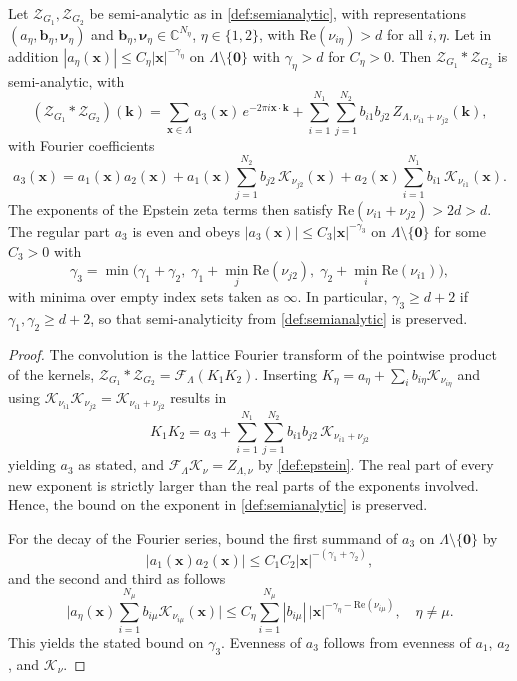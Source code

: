 \documentclass[]{amsart}
\numberwithin{mythm}{section}
\begin{document}
\begin{theorem}
\label{thm:convolution}
Let $\mathcal Z_{G_1},\mathcal Z_{G_2}$ be semi-analytic as in \cref{def:semianalytic}, with representations $(a_\eta,\bm b_\eta,\bm\nu_\eta)$ and $\bm b_\eta,\bm\nu_\eta\in\mathds C^{N_\eta}$, $\eta\in\{1,2\}$, with $\mathrm{Re}(\nu_{i\eta})>d$ for all $i,\eta$. Let in addition $|a_\eta(\bm x)|\le C_\eta|\bm x|^{-\gamma_\eta}$ on $\Lambda\setminus\{\bm 0\}$ with $\gamma_\eta>d$ for $C_\eta>0$. Then $\mathcal Z_{G_1}\ast\mathcal Z_{G_2}$ is semi-analytic, with
\[
(\mathcal Z_{G_1}\ast\mathcal Z_{G_2})(\bm k)
=\sum_{\bm x\in\Lambda}a_3(\bm x)\,e^{-2\pi i\bm x\cdot\bm k}+\sum_{i=1}^{N_1}\sum_{j=1}^{N_2}b_{i1}b_{j2}\,
Z_{\Lambda,\nu_{i1}+\nu_{j2}}(\bm k),
\]
with Fourier coefficients
\[
a_3(\bm x)=a_1(\bm x)a_2(\bm x)
+a_1(\bm x)\sum_{j=1}^{N_2}b_{j2}\,\mathcal K_{\nu_{j2}}(\bm x)
+a_2(\bm x)\sum_{i=1}^{N_1}b_{i1}\,\mathcal K_{\nu_{i1}}(\bm x) .
\]
The exponents of the Epstein zeta terms then satisfy $\mathrm{Re}(\nu_{i1}+\nu_{j2})>2d>d$. The regular part $a_3$ is even and obeys $|a_3(\bm x)|\le C_3|\bm x|^{-\gamma_3}$ on $\Lambda\setminus\{\bm 0\}$ for some $C_3>0$ with
\[
\gamma_3=\min\big(\gamma_1+\gamma_2,\;\gamma_1+\min_j\mathrm{Re}(\nu_{j2}),\;
\gamma_2+\min_i\mathrm{Re}(\nu_{i1})\big),
\]
with minima over empty index sets taken as $\infty$. In particular, $\gamma_3\ge d+2$ if $\gamma_1,\gamma_2\ge d+2$, so that semi-analyticity from \cref{def:semianalytic} is preserved.
\end{theorem}
\begin{proof}
The convolution is the lattice Fourier transform of the pointwise product of the kernels,
$\mathcal Z_{G_1}\ast\mathcal Z_{G_2}=\mathcal F_\Lambda(K_1K_2)$. Inserting
$K_\eta=a_\eta+\sum_i b_{i\eta}\mathcal K_{\nu_{i\eta}}$ and using
$\mathcal K_{\nu_{i1}}\mathcal K_{\nu_{j2}}=\mathcal K_{\nu_{i1}+\nu_{j2}}$ results in
\[
K_1K_2=a_3+\sum_{i=1}^{N_1}\sum_{j=1}^{N_2}b_{i1}b_{j2}\,
\mathcal K_{\nu_{i1}+\nu_{j2}}
\]
yielding $a_3$ as stated, and $\mathcal F_\Lambda\mathcal K_\nu=Z_{\Lambda,\nu}$ by
\cref{def:epstein}. The real part of every new exponent is strictly larger than the real parts of the exponents involved. Hence, the bound on the exponent in \cref{def:semianalytic} is preserved.

For the decay of the Fourier series, bound the first summand of $a_3$ on $\Lambda\setminus\{\bm 0\}$ by
\[
|a_1(\bm x)a_2(\bm x)|\le C_1C_2|\bm x|^{-(\gamma_1+\gamma_2)},
\]
and the second and third as follows
\[
\bigg|a_\eta(\bm x)\sum_{i=1}^{N_{\mu}} b_{i\mu}\mathcal K_{\nu_{i\mu}}(\bm x)\bigg|
\le C_\eta\sum_{i=1}^{N_{\mu}}|b_{i\mu}|\,|\bm x|^{-\gamma_\eta-\mathrm{Re}(\nu_{i\mu})},
\quad \eta\neq\mu.
\]
This yields the stated bound on $\gamma_3$. Evenness of $a_3$ follows from evenness of $a_1$, $a_2$, and $\mathcal K_\nu$.
\end{proof}
\end{document}
